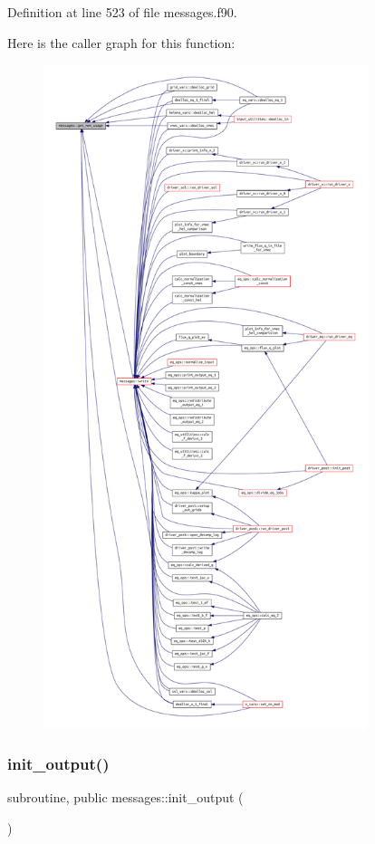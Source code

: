 Definition at line 523 of file messages.\+f90.

Here is the caller graph for this function\+:
\nopagebreak
\begin{figure}[H]
\begin{center}
\leavevmode
\includegraphics[height=550pt]{namespacemessages_a82dddaab795b78b3d39e1ff1aab2f665_icgraph}
\end{center}
\end{figure}
\mbox{\label{namespacemessages_aff8b6368cf0f8895b0f6c357df98cc21}} 
\subsubsection{\texorpdfstring{init\+\_\+output()}{init\_output()}}
{\footnotesize\ttfamily subroutine, public messages\+::init\+\_\+output (\begin{DoxyParamCaption}{ }\end{DoxyParamCaption})}



